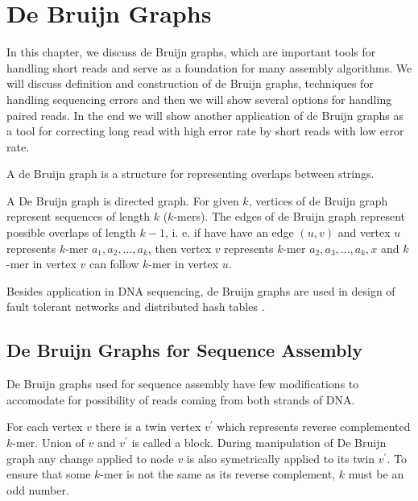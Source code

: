 \chapter{De Bruijn Graphs}

In this chapter, we discuss de Bruijn graphs, which are important tools
for handling short reads and serve as a foundation for many assembly algorithms.
We will discuss definition and construction of de Bruijn graphs,
techniques for handling sequencing errors and then we will show several
options for handling paired reads. In the end we will show another
application of de Bruijn graphs as a tool for correcting long read with high error
rate by short reads with low error rate.

\bigskip

A de Bruijn graph \citep{de1946combinatorial} is a structure for representing
overlaps between strings.

\begin{definition}
A De Bruijn graph is directed graph. 
For given $k$, vertices of de Bruijn graph represent sequences of length $k$
($k$-mers). The edges of de Bruijn graph represent possible overlaps of length $k-1$, i. e. 
if have have an edge $(u, v)$ and vertex $u$ represents $k$-mer $a_1, a_2, \dots, a_k$, then
vertex $v$ represents $k$-mer $a_2, a_3, \dots, a_k, x$ and $k$-mer in vertex $v$ can
follow $k$-mer in vertex $u$.
\end{definition}

Besides application in DNA sequencing, de Bruijn graphs are used
in design of fault tolerant networks \citep{ftndeb} and 
distributed hash tables \citep{koorde}.

\section{De Bruijn Graphs for Sequence Assembly}


De Bruijn graphs used for sequence assembly
\citep{pevzner2001eulerian,Velvet} have few modifications
to accomodate for possibility of reads coming from both strands of DNA.

For each vertex $v$ there is a twin vertex $v^{'}$ which
represents reverse complemented $k$-mer. Union of $v$ and $v^{'}$ is called a block.
During manipulation of De Bruijn graph any change applied to node $v$ is also symetrically
applied to its twin $v^{'}$.
To ensure that some $k$-mer is not the same as its reverse complement, $k$ must be an odd number.

